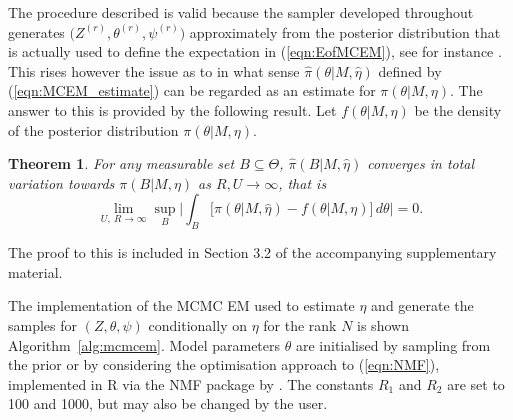 \documentclass{bioinfo}
\newtheorem{thrm}{Theorem}
\begin{document}
The procedure described is valid because the sampler developed
throughout generates $\big(Z^{(r)}, \theta^{(r)}, \psi^{(r)}\big)$
approximately from the posterior distribution that is actually used to
define the expectation in (\ref{eqn:EofMCEM}), see for instance
\cite{FM}. This rises however the issue as to in what sense
$\widehat\pi(\theta|M, \hat\eta)$ defined by (\ref{eqn:MCEM_estimate})
can be regarded as an estimate for $\pi(\theta|M, \eta)$. The answer
to this is provided by the following result. Let $f(\theta|M, \eta)$
be the density of the posterior distribution $\pi(\theta|M, \eta)$.

\begin{thrm} For any measurable set $B\subseteq \Theta$,
 $\widehat\pi(B|M,\hat\eta)$ converges in total variation
towards $\pi(B|M,\eta)$ as $R, U \to \infty$, that is
\[
   \lim_{U,\ R\to\infty}
   \sup_{B}
    \bigg|
     \int_B
     \Big[
       \widehat \pi(\theta|M, \hat\eta) - f(\theta|M,\eta)
     \Big]\, d\theta
    \bigg|
   = 0.
\]
\end{thrm}

The proof to this is included in Section 3.2 of the accompanying 
supplementary material. 

The implementation of the MCMC EM used to estimate $\eta$ and generate
the samples for $(Z, \theta, \psi)$ conditionally on $\eta$ for the
rank $N$ is shown Algorithm~\ref{alg:mcmcem}. Model parameters
$\theta$ are initialised by sampling from the prior or by considering
the optimisation approach to (\ref{eqn:NMF}), implemented in R via the
NMF package by \cite{GS}. The constants $R_1$ and $R_2$ are set to 100
and 1000, but may also be changed by the user.
\end{document}
